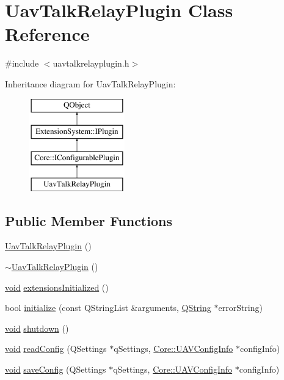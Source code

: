 \hypertarget{class_uav_talk_relay_plugin}{\section{Uav\-Talk\-Relay\-Plugin Class Reference}
\label{class_uav_talk_relay_plugin}
}


{\ttfamily \#include $<$uavtalkrelayplugin.\-h$>$}

Inheritance diagram for Uav\-Talk\-Relay\-Plugin\-:\begin{figure}[H]
\begin{center}
\leavevmode
\includegraphics[height=4.000000cm]{class_uav_talk_relay_plugin}
\end{center}
\end{figure}
\subsection*{Public Member Functions}
\begin{DoxyCompactItemize}
\item 
\hyperlink{group___u_a_v_talk_ga425fbe805214fb0a0ec2eb24f6bf0af4}{Uav\-Talk\-Relay\-Plugin} ()
\item 
\hyperlink{group___u_a_v_talk_gaad7159b5c609edca5e23031119f623c7}{$\sim$\-Uav\-Talk\-Relay\-Plugin} ()
\item 
\hyperlink{group___u_a_v_objects_plugin_ga444cf2ff3f0ecbe028adce838d373f5c}{void} \hyperlink{group___u_a_v_talk_ga23c510f5254ca286083d1b3e4a732582}{extensions\-Initialized} ()
\item 
bool \hyperlink{group___u_a_v_talk_gacb02c97b971babafb922150887825934}{initialize} (const Q\-String\-List \&arguments, \hyperlink{group___u_a_v_objects_plugin_gab9d252f49c333c94a72f97ce3105a32d}{Q\-String} $\ast$error\-String)
\item 
\hyperlink{group___u_a_v_objects_plugin_ga444cf2ff3f0ecbe028adce838d373f5c}{void} \hyperlink{group___u_a_v_talk_ga2a3c3d63a751ae8931cfbd8cf30792ba}{shutdown} ()
\item 
\hyperlink{group___u_a_v_objects_plugin_ga444cf2ff3f0ecbe028adce838d373f5c}{void} \hyperlink{group___u_a_v_talk_ga56f6231aec2bb6b547cd07b4533cb949}{read\-Config} (Q\-Settings $\ast$q\-Settings, \hyperlink{class_core_1_1_u_a_v_config_info}{Core\-::\-U\-A\-V\-Config\-Info} $\ast$config\-Info)
\item 
\hyperlink{group___u_a_v_objects_plugin_ga444cf2ff3f0ecbe028adce838d373f5c}{void} \hyperlink{group___u_a_v_talk_ga36180ad0b7197a844dfe5ff50a116aa1}{save\-Config} (Q\-Settings $\ast$q\-Settings, \hyperlink{class_core_1_1_u_a_v_config_info}{Core\-::\-U\-A\-V\-Config\-Info} $\ast$config\-Info)
\end{DoxyCompactItemize}
